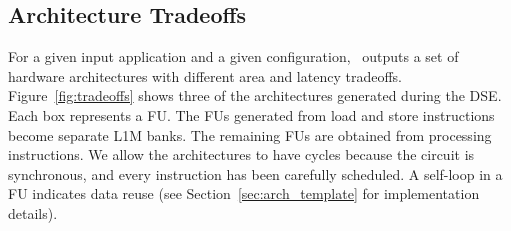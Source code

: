 \subsection{Architecture Tradeoffs}
\vspace{-1mm}
For a given input application and a given configuration, \frameworkname~outputs a set of hardware architectures with different area and latency tradeoffs. Figure~\ref{fig:tradeoffs} shows three of the architectures generated during the DSE. Each box represents a FU. The FUs generated from load and store instructions become separate L1M banks. The remaining FUs are obtained from processing instructions. We allow the architectures to have cycles because the circuit is synchronous, and every instruction has been carefully scheduled. A self-loop in a FU indicates data reuse (see Section~\ref{sec:arch_template} for implementation details).
